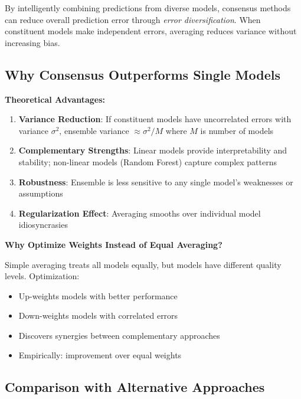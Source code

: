 By intelligently combining predictions from diverse models, consensus methods can reduce overall prediction error through \textit{error diversification}. When constituent models make independent errors, averaging reduces variance without increasing bias.

\subsection{Why Consensus Outperforms Single Models}

\textbf{Theoretical Advantages:}

\begin{enumerate}
    \item \textbf{Variance Reduction}: If constituent models have uncorrelated errors with variance $\sigma^2$, ensemble variance $\approx \sigma^2/M$ where $M$ is number of models
    
    \item \textbf{Complementary Strengths}: Linear models provide interpretability and stability; non-linear models (Random Forest) capture complex patterns
    
    \item \textbf{Robustness}: Ensemble is less sensitive to any single model's weaknesses or assumptions
    
    \item \textbf{Regularization Effect}: Averaging smooths over individual model idiosyncrasies
\end{enumerate}

\textbf{Why Optimize Weights Instead of Equal Averaging?}

Simple averaging treats all models equally, but models have different quality levels. Optimization:
\begin{itemize}
    \item Up-weights models with better performance
    \item Down-weights models with correlated errors
    \item Discovers synergies between complementary approaches
    \item Empirically: \ModelElevenImprovementOverEqual{} improvement over equal weights
\end{itemize}

\subsection{Comparison with Alternative Approaches}

